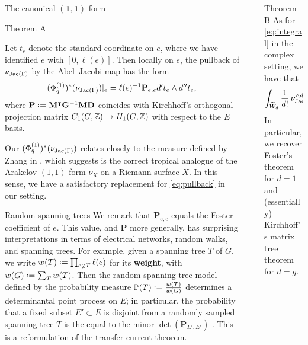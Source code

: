 \documentclass[final]{beamer}
\newcommand*{\defn}[1]{\textbf{#1}}
\newlength{\sepwidth}
\newlength{\colwidth}
\newcommand{\separatorcolumn}{\begin{column}{\sepwidth}\end{column}}
\begin{document}
\begin{frame}[t]
\begin{columns}[t]
\begin{column}{\colwidth}
\begin{block}{The canonical $\mathbf{(1,1)}$-form}
\end{block}

\begin{alertblock}{Theorem A}

Let $t_{e}$ denote the standard coordinate on $e$, where we have identified $e$ with $[0,\ell(e)]$. Then locally on $e$, the pullback of $\nu_{\operatorname{Jac}(\Gamma)}$ by the Abel--Jacobi map has the form
\begin{equation}
  (\Phi_{q}^{(1)})^{*}(\nu_{\operatorname{Jac}(\Gamma)})|_{e} = \ell(e)^{-1} \mathbf{P}_{e,e} d't_{e} \wedge d''t_{e},
\end{equation}
where $\mathbf{P} \defeq \mathbf{M}^{\transpose}\mathbf{G}^{-1}\mathbf{MD}$ coincides with Kirchhoff's orthogonal projection matrix $C_{1}(G,\mathbb{Z}) \to H_{1}(G,\mathbb{Z})$ with respect to the $E$ basis.
\end{alertblock}

\begin{block*}
  Our $(\Phi_{q}^{(1)})^{*}(\nu_{\operatorname{Jac}(\Gamma)})$ relates closely to the measure defined by Zhang in \cite{zhang1993admissible}, which \cite{baker2011metric} suggests is the correct tropical analogue of the Arakelov $(1,1)$-form $\nu_{X}$ on a Riemann surface $X$.  In this sense, we have a satisfactory replacement for \cref{eq:pullback} in our setting.
\end{block*}  

\begin{exampleblock}{Random spanning trees}
We remark that $\mathbf{P}_{e,e}$ equals the Foster coefficient of $e$.  This value, and $\mathbf{P}$ more generally, has surprising interpretations in terms of electrical networks, random walks, and spanning trees.  For example, given a spanning tree $T$ of $G$, we write $w(T) \defeq \prod_{e \not\in T} \ell(e)$ for its \defn{weight}, with $w(G) \defeq \sum_{T} w(T)$.  Then the random spanning tree model defined by the probability measure $\PP(T) \defeq \frac{w(T)}{w(G)}$ determines a determinantal point process on $E$; in particular, the probability that a fixed subset $E' \subset E$ is disjoint from a randomly sampled spanning tree $T$ is the equal to the minor $\det(\mathbf{P}_{E',E'})$ \cite{dejong2022cross}.  This is a reformulation of the transfer-current theorem.
\end{exampleblock}
\end{column}

\separatorcolumn

\begin{column}{\colwidth}

\begin{alertblock}{Theorem B}
As for \cref{eq:integral} in the complex setting, we have that
\begin{equation}
  \int_{\widetilde W_{d}} \frac{1}{d!}\,\nu^{\wedge d}_{\operatorname{Jac}(\Gamma)} = \binom{g}{d}.
\end{equation}
In particular, we recover Foster's theorem for $d = 1$ and (essentially) Kirchhoff's matrix tree theorem for $d = g$.
\end{alertblock}


\end{column}
\end{columns}
\end{frame}
\end{document}
